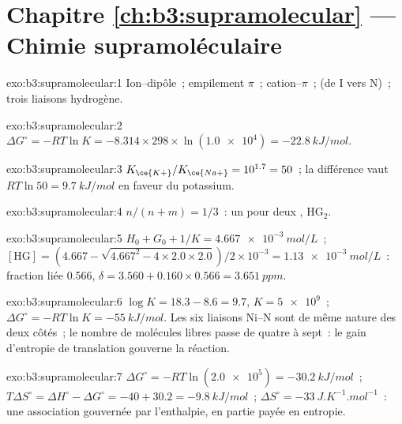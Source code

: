 \section*{Chapitre \ref{ch:b3:supramolecular} --- Chimie supramoléculaire}

\begin{solution}{exo:b3:supramolecular:1}
Ion--dipôle~; empilement $\pi$~; cation--$\pi$~;  (de I vers N)~; trois liaisons hydrogène.
\end{solution}

\begin{solution}{exo:b3:supramolecular:2}
$\Delta G^\circ = -RT\ln K = -8.314 \times 298 \times \ln(\num{1.0e4}) = \qty{-22.8}{kJ/mol}$.
\end{solution}

\begin{solution}{exo:b3:supramolecular:3}
$K_{\ce{K+}}/K_{\ce{Na+}} = 10^{1.7} = 50$~; la différence vaut $RT\ln 50 = \qty{9.7}{kJ/mol}$ en faveur du potassium.
\end{solution}

\begin{solution}{exo:b3:supramolecular:4}
$n/(n + m) = 1/3$~: un  pour deux , $\mathrm{HG_2}$.
\end{solution}

\begin{solution}{exo:b3:supramolecular:5}
$H_0 + G_0 + 1/K = \qty{4.667e-3}{mol/L}$~; $[\mathrm{HG}] = (4.667 - \sqrt{4.667^2 - 4 \times 2.0 \times 2.0})/2 \times 10^{-3} = \qty{1.13e-3}{mol/L}$~: fraction
liée 0.566, $\delta = 3.560 + 0.160 \times 0.566 = \qty{3.651}{ppm}$.
\end{solution}

\begin{solution}{exo:b3:supramolecular:6}
$\log K = 18.3 - 8.6 = 9.7$, $K = \num{5e9}$~; $\Delta G^\circ = -RT\ln K = \qty{-55}{kJ/mol}$. Les six liaisons Ni--N sont de
même nature des deux côtés~; le nombre de molécules libres passe de quatre
à sept~: le gain d'entropie de translation gouverne la réaction.
\end{solution}

\begin{solution}{exo:b3:supramolecular:7}
$\Delta G^\circ = -RT\ln(\num{2.0e5}) = \qty{-30.2}{kJ/mol}$~; $T\Delta S^\circ = \Delta H^\circ - \Delta G^\circ = -40 + 30.2 = \qty{-9.8}{kJ/mol}$~;
$\Delta S^\circ = \qty{-33}{J.K^{-1}.mol^{-1}}$~: une association gouvernée par l'enthalpie, en partie payée en entropie.
\end{solution}

